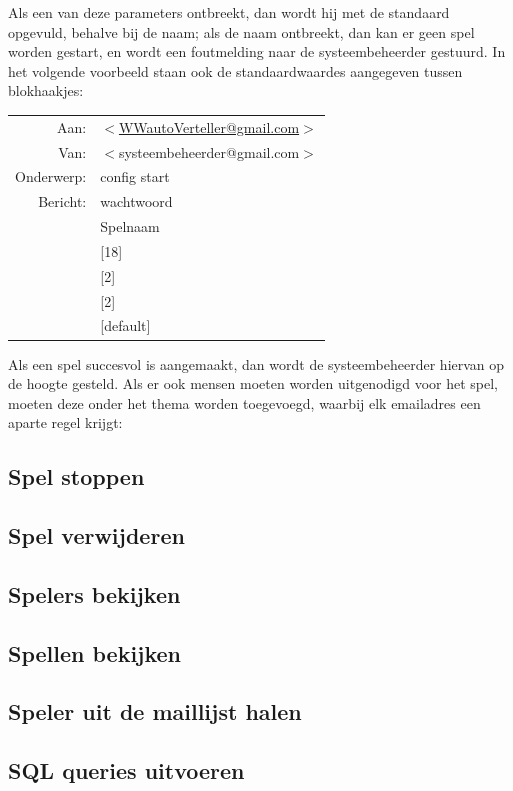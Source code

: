 \documentclass[12pt]{article}
\begin{document}
    Als een van deze parameters ontbreekt, dan wordt hij met de standaard opgevuld, behalve bij de naam; als de naam ontbreekt, dan kan er geen spel worden gestart, en wordt een foutmelding naar de systeembeheerder gestuurd. In het volgende voorbeeld staan ook de standaardwaardes aangegeven tussen blokhaakjes:
    
    \begin{center}
      \begin{tabularx}{0.75\textwidth}[c]{|r X|}
	\hline
	Aan: & \href{mailto:<WWautoVerteller@gmail.com>}{$<$WWautoVerteller@gmail.com$>$} \\
	Van: & $<$systeembeheerder@gmail.com$>$ \\
	Onderwerp: & config start \\[\baselineskip]	
	Bericht: & wachtwoord \\
	 & Spelnaam \\
	 & [18] \\
	 & [2] \\
	 & [2] \\
	 & [default] \\
	\hline
      \end{tabularx}
    \end{center}
    
    Als een spel succesvol is aangemaakt, dan wordt de systeembeheerder hiervan op de hoogte gesteld. Als er ook mensen moeten worden uitgenodigd voor het spel, moeten deze onder het thema worden toegevoegd, waarbij elk emailadres een aparte regel krijgt:
  
  \subsection{Spel stoppen}
  
  \subsection{Spel verwijderen}
  
  \subsection{Spelers bekijken}
  
  \subsection{Spellen bekijken}
  
  \subsection{Speler uit de maillijst halen}
  
  \subsection{SQL queries uitvoeren}
\end{document}
